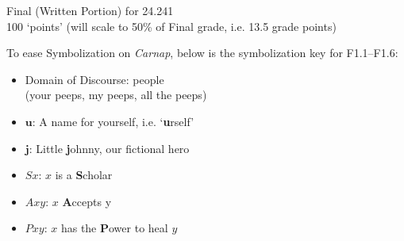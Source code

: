 \documentclass[12pt]{article}
\begin{document}
%
%
\newcommand{\detritus}[1]{}


\thispagestyle{empty}






\begin{center}
\large Final (Written Portion) for 24.241 \\[1ex] 
\normalsize 100 `points' (will scale to 50\% of Final grade, i.e. 13.5 grade points)
\end{center}



To ease Symbolization on \textit{Carnap}, below is the symbolization key for F1.1--F1.6: 
\begin{multicols}{2}
\begin{itemize}
\item Domain of Discourse: people\\  (your peeps, my peeps, all the peeps)
\item $\mathbf{u}$: A name for yourself, i.e. `\textbf{u}rself' 
\item $\mathbf{j}$: Little \textbf{j}ohnny, our fictional hero  
\item $Sx$: $x$ is a \textbf{S}cholar 
\item $Axy$: $x$ \textbf{A}ccepts y
\item $Pxy$: $x$ has the \textbf{P}ower to heal $y$
\end{itemize}
\end{multicols}

\medskip
\end{document}
